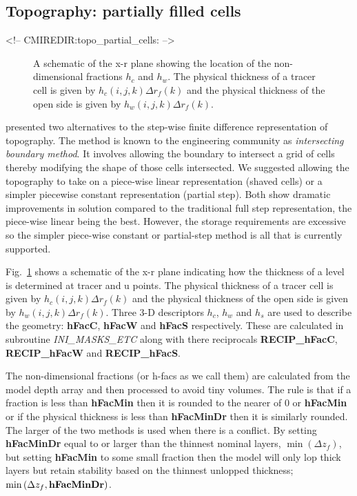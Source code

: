 \subsection{Topography: partially filled cells}
\begin{rawhtml}
<!-- CMIREDIR:topo_partial_cells: -->
\end{rawhtml}

\begin{figure}
\begin{center}
\end{center}
\caption{
A schematic of the x-r plane showing the location of the
non-dimensional fractions $h_c$ and $h_w$. The physical thickness of a
tracer cell is given by $h_c(i,j,k) \Delta r_f(k)$ and the physical
thickness of the open side is given by $h_w(i,j,k) \Delta r_f(k)$.}
\label{fig:hfacs}
\end{figure}

\cite{adcroft:97} presented two alternatives to the step-wise finite
difference representation of topography. The method is known to the
engineering community as {\em intersecting boundary method}. It
involves allowing the boundary to intersect a grid of cells thereby
modifying the shape of those cells intersected. We suggested allowing
the topography to take on a piece-wise linear representation (shaved
cells) or a simpler piecewise constant representation (partial step).
Both show dramatic improvements in solution compared to the
traditional full step representation, the piece-wise linear being the
best. However, the storage requirements are excessive so the simpler
piece-wise constant or partial-step method is all that is currently
supported.

Fig.~\ref{fig:hfacs} shows a schematic of the x-r plane indicating how
the thickness of a level is determined at tracer and u points.
The physical thickness of a tracer cell is given by $h_c(i,j,k) \Delta
r_f(k)$ and the physical thickness of the open side is given by
$h_w(i,j,k) \Delta r_f(k)$. Three 3-D descriptors $h_c$, $h_w$ and
$h_s$ are used to describe the geometry: {\bf hFacC}, {\bf hFacW} and
{\bf hFacS} respectively. These are calculated in subroutine {\em
INI\_MASKS\_ETC} along with there reciprocals {\bf RECIP\_hFacC}, {\bf
RECIP\_hFacW} and {\bf RECIP\_hFacS}.

The non-dimensional fractions (or h-facs as we call them) are
calculated from the model depth array and then processed to avoid tiny
volumes. The rule is that if a fraction is less than {\bf hFacMin}
then it is rounded to the nearer of $0$ or {\bf hFacMin} or if the
physical thickness is less than {\bf hFacMinDr} then it is similarly
rounded. The larger of the two methods is used when there is a
conflict. By setting {\bf hFacMinDr} equal to or larger than the
thinnest nominal layers, $\min{(\Delta z_f)}$, but setting {\bf
hFacMin} to some small fraction then the model will only lop thick
layers but retain stability based on the thinnest unlopped thickness;
$\min{(\Delta z_f,\mbox{\bf hFacMinDr})}$.

